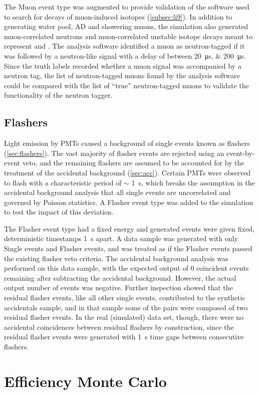 The Muon event type was augmented to provide validation
of the software used to search for decays of muon-induced isotopes
(\cref{subsec:li9}).
In addition to generating water pool, AD and showering muons,
the simulation also generated muon-correlated neutrons
and muon-correlated unstable isotope decays
meant to represent \li and \he.
The analysis software identified a muon as neutron-tagged
if it was followed by a neutron-like signal
with a delay of between \SIlist{20;200}{\us}.
Since the truth labels recorded whether a muon signal
was accompanied by a neutron tag,
the list of neutron-tagged muons found by the analysis software
could be compared with the list of ``true'' neutron-tagged muons
to validate the functionality of the neutron tagger.

\subsection{Flashers}
\label{subsec:toymc_flashers}

Light emission by PMTs caused a background of single events
known as flashers (\cref{sec:flashers}).
The vast majority of flasher events are rejected using an event-by-event veto,
and the remaining flashers are assumed to be accounted for
by the treatment of the accidental background (\cref{sec:acc}).
Certain PMTs were observed to flash with a characteristic period of $\sim$ \SI{1}{\s},
which breaks the assumption in the accidental background analysis
that all single events are uncorrelated and governed by Poisson statistics.
A Flasher event type was added to the simulation to test the impact of this deviation.

The Flasher event type had a fixed energy
and generated events were given fixed, deterministic timestamps \SI{1}{\s} apart.
A data sample was generated with only Single events and Flasher events,
and was treated as if the Flasher events passed the existing flasher veto criteria.
The accidental background analysis was performed on this data sample,
with the expected output of \num{0} coincident events remaining
after subtracting the accidental background.
However, the actual output number of events was negative.
Further inspection showed that the residual flasher events,
like all other single events,
contributed to the synthetic accidentals sample,
and in that sample some of the pairs
were composed of two residual flasher events.
In the real (simulated) data set, though,
there were no accidental coincidences between residual flashers by construction,
since the residual flasher events were generated with \SI{1}{\s} time gaps
between consecutive flashers.

\section{Efficiency Monte Carlo}
\label{sec:thu_toymc}
